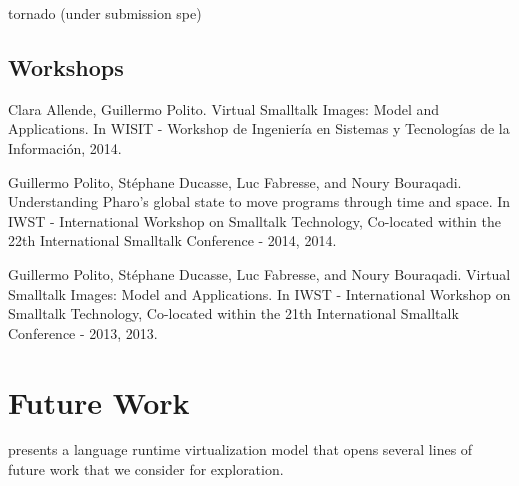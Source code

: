 tornado (under submission spe)

\subsection{Workshops}

Clara Allende, Guillermo Polito. Virtual Smalltalk Images: Model and Applications. In WISIT - Workshop de Ingeniería en Sistemas y Tecnologías de la Información, 2014.

Guillermo Polito, Stéphane Ducasse, Luc Fabresse, and Noury Bouraqadi. Understanding Pharo’s global state to move programs through time and space. In IWST - International Workshop on Smalltalk Technology, Co-located within the 22th International Smalltalk Conference - 2014, 2014.

Guillermo Polito, Stéphane Ducasse, Luc Fabresse, and Noury Bouraqadi. Virtual Smalltalk Images: Model and Applications. In IWST - International Workshop on Smalltalk Technology, Co-located within the 21th International Smalltalk Conference - 2013, 2013.

\section{Future Work}

\Vtt presents a language runtime virtualization model that opens several lines of future work that we consider for exploration.

